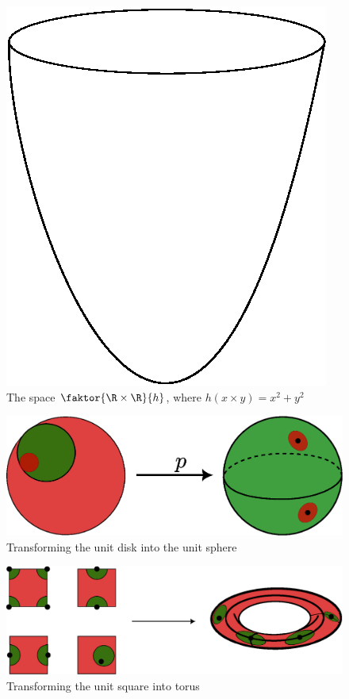 \begin{example}
\begin{enumerate}
            \begin{figure}[h]
                \centering
                \includegraphics[scale=0.4]{Figures/Chapter2/paraboloid_elliptic.eps}
                \caption{The space $\faktor{\R \times \R}{h}$, where $h(x \times
                y)=x^2+y^2$}
                \label{fig_2.6}
            \end{figure}
    \end{enumerate}
\end{example}

\begin{figure}[h]
    \centering
    \includegraphics[scale = 0.5]{Figures/Chapter2/disk_to_sphere.eps}
    \caption{Transforming the unit disk into the unit sphere}
    \label{fig_2.4}
\end{figure}

\begin{figure}[h]
    \centering
    \includegraphics[scale = 0.5]{Figures/Chapter2/square_to_torus_2.eps}
    \caption{Transforming the unit square into torus}
    \label{fig_2.4}
\end{figure}

